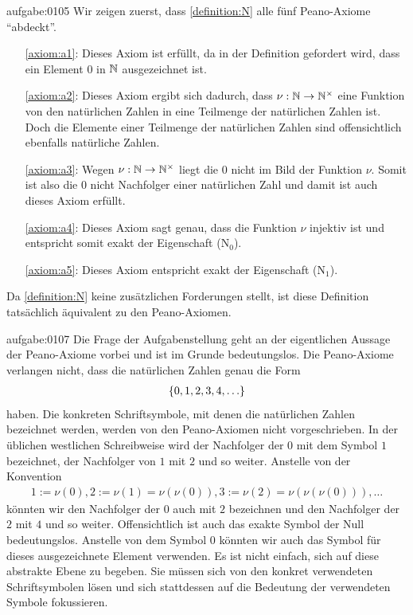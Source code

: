 \begin{antwort}{aufgabe:0105}
Wir zeigen zuerst, dass \cref{definition:N} alle fünf Peano-Axiome \enquote{abdeckt}.
\begin{itemize}
    \item[\cref{axiom:a1}:] Dieses Axiom ist erfüllt, da in der Definition gefordert wird, dass ein Element $0$ in $\mathbb{N}$ ausgezeichnet ist.
    \item[\cref{axiom:a2}:] Dieses Axiom ergibt sich dadurch, dass $\nu:\mathbb{N}\to\mathbb{N}^{\times}$ eine Funktion von den natürlichen Zahlen in eine Teilmenge der natürlichen Zahlen ist. Doch die Elemente einer Teilmenge der natürlichen Zahlen sind offensichtlich ebenfalls natürliche Zahlen.
    \item[\cref{axiom:a3}:] Wegen $\nu:\mathbb{N}\to\mathbb{N}^{\times}$ liegt die $0$ nicht im Bild der Funktion $\nu$. Somit ist also die $0$ nicht Nachfolger einer natürlichen Zahl und damit ist auch dieses Axiom erfüllt.
    \item[\cref{axiom:a4}:] Dieses Axiom sagt genau, dass die Funktion $\nu$ injektiv ist und entspricht somit exakt der Eigenschaft (N$_0$).
    \item[\cref{axiom:a5}:] Dieses Axiom entspricht exakt der Eigenschaft (N$_1$).
\end{itemize}
Da \cref{definition:N} keine zusätzlichen Forderungen stellt, ist diese Definition tatsächlich äquivalent zu den Peano-Axiomen.
\end{antwort}



\begin{antwort}{aufgabe:0107}
Die Frage der Aufgabenstellung geht an der eigentlichen Aussage der Peano-Axiome vorbei und ist im Grunde bedeutungslos. Die Peano-Axiome verlangen nicht, dass die natürlichen Zahlen genau die Form
\begin{align*}
    \left\{0,1,2,3,4,\ldots\right\}
\end{align*}
haben. Die konkreten Schriftsymbole, mit denen die natürlichen Zahlen bezeichnet werden, werden von den Peano-Axiomen nicht vorgeschrieben. In der üblichen westlichen Schreibweise wird der Nachfolger der $0$ mit dem Symbol $1$ bezeichnet, der Nachfolger von $1$ mit $2$ und so weiter. Anstelle von der Konvention
\begin{align*}
    1:=\nu(0), 2:=\nu(1)=\nu(\nu(0)), 3:=\nu(2)=\nu(\nu(\nu(0))), \ldots
\end{align*}
könnten wir den Nachfolger der $0$ auch mit $2$ bezeichnen und den Nachfolger der $2$ mit $4$ und so weiter. Offensichtlich ist auch das exakte Symbol der Null bedeutungslos. Anstelle von dem Symbol $0$ könnten wir auch das Symbol  für dieses ausgezeichnete Element verwenden. Es ist nicht einfach, sich auf diese abstrakte Ebene zu begeben. Sie müssen sich von den konkret verwendeten Schriftsymbolen lösen und sich stattdessen auf die Bedeutung der verwendeten Symbole fokussieren.
\end{antwort}

